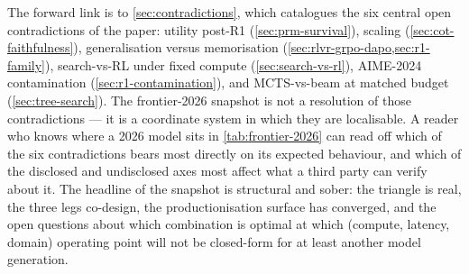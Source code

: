 The forward link is to \cref{sec:contradictions}, which catalogues the
six central open contradictions of the paper:
 utility post-R1 (\cref{sec:prm-survival}), 
scaling (\cref{sec:cot-faithfulness}),  generalisation versus
memorisation
(\cref{sec:rlvr-grpo-dapo,sec:r1-family}), search-vs-RL under fixed
compute (\cref{sec:search-vs-rl}), AIME-2024 contamination
(\cref{sec:r1-contamination}), and MCTS-vs-beam at matched budget
(\cref{sec:tree-search}). The frontier-2026 snapshot is not a
resolution of those contradictions --- it is a coordinate system in
which they are localisable. A reader who knows where a 2026 model sits
in \cref{tab:frontier-2026} can read off which of the six
contradictions bears most directly on its expected behaviour, and which
of the disclosed and undisclosed axes most affect what a third party
can verify about it. The headline of the snapshot is structural and
sober: the triangle is real, the three legs co-design, the
productionisation surface has converged, and the open questions about
which combination is optimal at which (compute, latency, domain)
operating point will not be closed-form for at least another model
generation.
